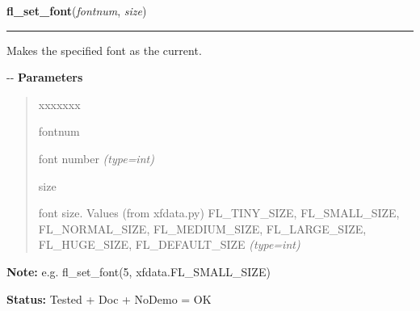     \label{xformslib:flbasic:fl_set_font}

    \vspace{0.5ex}

\hspace{.8\funcindent}\begin{boxedminipage}{\funcwidth}

    \raggedright \textbf{fl\_set\_font}(\textit{fontnum}, \textit{size})

    \vspace{-1.5ex}

    \rule{\textwidth}{0.5\fboxrule}
\setlength{\parskip}{2ex}

Makes the specified font as the current.

-{}-
\setlength{\parskip}{1ex}
      \textbf{Parameters}
      \vspace{-1ex}

      \begin{quote}
        \begin{Ventry}{xxxxxxx}

          \item[fontnum]


font number
            {\it (type=int)}

          \item[size]


font size. Values (from xfdata.py) FL\_TINY\_SIZE, FL\_SMALL\_SIZE,
FL\_NORMAL\_SIZE, FL\_MEDIUM\_SIZE, FL\_LARGE\_SIZE, FL\_HUGE\_SIZE,
FL\_DEFAULT\_SIZE
            {\it (type=int)}

        \end{Ventry}

      \end{quote}

\textbf{Note:} 
e.g. fl\_set\_font(5, xfdata.FL\_SMALL\_SIZE)


\textbf{Status:} 
Tested + Doc + NoDemo = OK


    \end{boxedminipage}

    \label{xformslib:flbasic:fl_get_char_height}

    \vspace{0.5ex}


